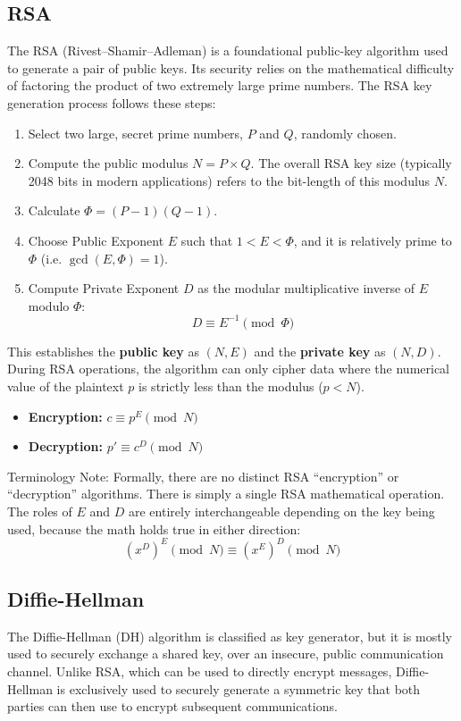 \subsection{RSA}
The RSA (Rivest--Shamir--Adleman) is a foundational public-key algorithm used to generate a pair of public keys.
Its security relies on the mathematical difficulty of factoring the product of two extremely large prime numbers.
The RSA key generation process follows these steps:
\begin{enumerate}
    \item Select two large, secret prime numbers, $P$ and $Q$, randomly chosen.
    \item Compute the public modulus $N = P \times Q$. The overall RSA key size (typically 2048 bits in modern applications) refers to the bit-length of this modulus $N$.
    \item Calculate $\Phi = (P-1)(Q-1)$.
    \item Choose Public Exponent $E$ such that $1 < E < \Phi$, and it is relatively prime to $\Phi$ (i.e. $\gcd(E, \Phi) = 1$).
    \item Compute Private Exponent $D$ as the modular multiplicative inverse of $E$ modulo $\Phi$:
    \[
    D \equiv E^{-1} \pmod{\Phi}
    \]
\end{enumerate}

\noindent This establishes the \textbf{public key} as $(N, E)$ and the \textbf{private key} as $(N, D)$.
During RSA operations, the algorithm can only cipher data where the numerical value of the plaintext $p$ is strictly less than the modulus ($p < N$).

\begin{itemize}
    \item \textbf{Encryption:} $c \equiv p^E \pmod{N}$
    \item \textbf{Decryption:} $p' \equiv c^D \pmod{N}$
\end{itemize}

Terminology Note: Formally, there are no distinct RSA ``encryption'' or ``decryption'' algorithms. There is simply a single RSA mathematical operation. The roles of $E$ and $D$ are entirely interchangeable depending on the key being used, because the math holds true in either direction:
\[
(x^D)^E \pmod{N} \equiv (x^E)^D \pmod{N}
\]

\subsection{Diffie-Hellman}
The Diffie-Hellman (DH) algorithm is classified as key generator, but it is mostly used to securely exchange a shared key, over an insecure, public communication channel.
Unlike RSA, which can be used to directly encrypt messages, Diffie-Hellman is exclusively used to securely generate a symmetric key that both parties can then use to encrypt subsequent communications.

